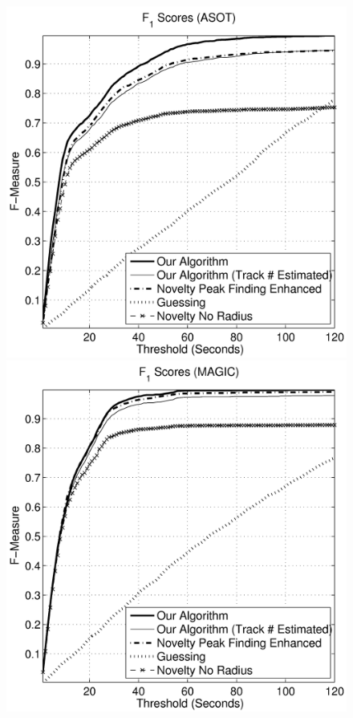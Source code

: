 \documentclass[twocolumn]{article}
\begin{document}
\begin{figure}
	\begin{center}
		
		\begin{minipage}[t]{0.45\linewidth}
			\begin{center}
				\includegraphics[scale=0.5]{images/fasot}
			\end{center}
		\end{minipage}
		\begin{minipage}[t]{0.45\linewidth}
			\begin{center}
				\includegraphics[scale=0.5]{images/magic}
			\end{center}
		\end{minipage}
		\bigskip
		

\end{center}
\end{figure}
\end{document}
